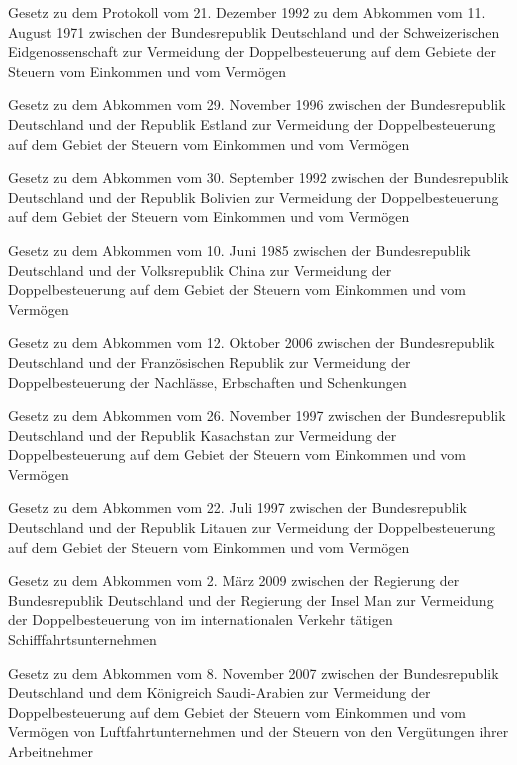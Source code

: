 \item[{DBACHE1971Prot1992G}] Gesetz zu dem Protokoll vom 21. Dezember 1992 zu dem Abkommen vom 11. August 1971 zwischen der Bundesrepublik Deutschland und der Schweizerischen Eidgenossenschaft zur Vermeidung der Doppelbesteuerung auf dem Gebiete der Steuern vom Einkommen und vom Vermögen

\item[{DBAESTG}] Gesetz zu dem Abkommen vom 29. November 1996 zwischen der Bundesrepublik Deutschland und der Republik Estland zur Vermeidung der Doppelbesteuerung auf dem Gebiet der Steuern vom Einkommen und vom Vermögen

\item[{DBAG-BOL}] Gesetz zu dem Abkommen vom 30. September 1992 zwischen der Bundesrepublik Deutschland und der Republik Bolivien zur Vermeidung der Doppelbesteuerung auf dem Gebiet der Steuern vom Einkommen und vom Vermögen

\item[{DBAG-CHN}] Gesetz zu dem Abkommen vom 10. Juni 1985 zwischen der Bundesrepublik Deutschland und der Volksrepublik China zur Vermeidung der Doppelbesteuerung auf dem Gebiet der Steuern vom Einkommen und vom Vermögen

\item[{DBAG-FRA-2006}] Gesetz zu dem Abkommen vom 12. Oktober 2006 zwischen der Bundesrepublik Deutschland und der Französischen Republik zur Vermeidung der Doppelbesteuerung der Nachlässe, Erbschaften und Schenkungen

\item[{DBAG-KAZ}] Gesetz zu dem Abkommen vom 26. November 1997 zwischen der Bundesrepublik Deutschland und der Republik Kasachstan zur Vermeidung der Doppelbesteuerung auf dem Gebiet der Steuern vom Einkommen und vom Vermögen

\item[{DBAG-LTU}] Gesetz zu dem Abkommen vom 22. Juli 1997 zwischen der Bundesrepublik Deutschland und der Republik Litauen zur Vermeidung der Doppelbesteuerung auf dem Gebiet der Steuern vom Einkommen und vom Vermögen

\item[{DBAG-MAN}] Gesetz zu dem Abkommen vom 2. März 2009 zwischen der Regierung der Bundesrepublik Deutschland und der Regierung der Insel Man zur Vermeidung der Doppelbesteuerung von im internationalen Verkehr tätigen Schifffahrtsunternehmen

\item[{DBAG-SAU}] Gesetz zu dem Abkommen vom 8. November 2007 zwischen der Bundesrepublik Deutschland und dem Königreich Saudi-Arabien zur Vermeidung der Doppelbesteuerung auf dem Gebiet der Steuern vom Einkommen und vom Vermögen von Luftfahrtunternehmen und der Steuern von den Vergütungen ihrer Arbeitnehmer


